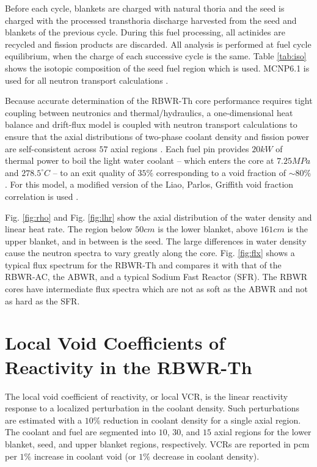 \documentclass[11pt]{article}
\newcommand{\tild}[0]{\sim\!\!}
\begin{document}
Before each cycle, blankets are charged with natural thoria and the seed is charged with the processed transthoria discharge harvested from the seed and blankets of the previous cycle.
During this fuel processing, all actinides are recycled and fission products are discarded.
All analysis is performed at fuel cycle equilibrium, when the charge of each successive cycle is the same.
Table \ref{tab:iso} shows the isotopic composition of the seed fuel region which is used.
MCNP6.1 is used for all neutron transport calculations \cite{lanl2013mcnp6}.

Because accurate determination of the RBWR-Th core performance requires tight coupling between neutronics and thermal/hydraulics, a one-dimensional heat balance and drift-flux model is coupled with neutron transport calculations to ensure that the axial distributions of two-phase coolant density and fission power are self-consistent across $57$ axial regions \cite{seifried2013aec}.
Each fuel pin provides $20kW$ of thermal power to boil the light water coolant -- which enters the core at $7.25MPa$ and $278.5 ^\circ C$ -- to an exit quality of $35\%$ corresponding to a void fraction of $\tild 80\%$.
For this model, a modified version of the Liao, Parlos, Griffith void fraction correlation is used \cite{shirvan2013bev}.

Fig. \ref{fig:rho} and Fig. \ref{fig:lhr} show the axial distribution of the water density and linear heat rate.
The region below $50cm$ is the lower blanket, above $161cm$ is the upper blanket, and in between is the seed.
The large differences in water density cause the neutron spectra to vary greatly along the core.
Fig. \ref{fig:flx} shows a typical flux spectrum for the RBWR-Th and compares it with that of the RBWR-AC, the ABWR, and a typical Sodium Fast Reactor (SFR).
The RBWR cores have intermediate flux spectra which are not as soft as the ABWR and not as hard as the SFR.

\section{Local Void Coefficients of Reactivity in the RBWR-Th}
\label{sec:rbwrth}

The local void coefficient of reactivity, or local VCR, is the linear reactivity response to a localized perturbation in the coolant density.
Such perturbations are estimated with a $10\%$ reduction in coolant density for a single axial region.
The coolant and fuel are segmented into $10$, $30$, and $15$ axial regions for the lower blanket, seed, and upper blanket regions, respectively.
VCRs are reported in pcm per $1\%$ increase in coolant void (or $1\%$ decrease in coolant density).
\end{document}
